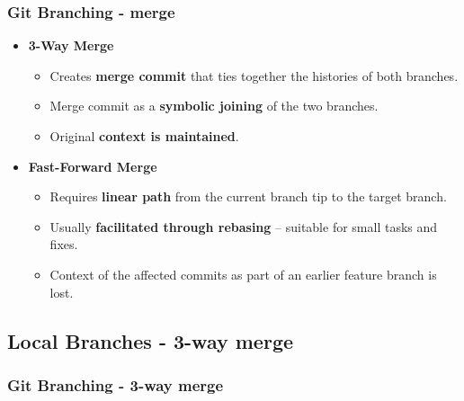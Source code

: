 \begin{frame}
\frametitle{Git Branching - merge}
\begin{itemize}
	\item \textbf{3-Way Merge}
		\begin{itemize}
		\item Creates \textbf{merge commit} that ties together the histories of both branches.
		\item Merge commit as a \textbf{symbolic joining} of the two branches.
		\item Original \textbf{context is maintained}.
		\end{itemize}
	\item \textbf{Fast-Forward Merge}
		\begin{itemize}
		\item Requires \textbf{linear path} from the current branch tip to the target branch.
		\item Usually \textbf{facilitated through rebasing} – suitable for small tasks and fixes.
		\item Context of the affected commits as part of an earlier feature branch is lost.
		\end{itemize}
\end{itemize}
\end{frame}

\subsection[]{Local Branches - 3-way merge}
\begin{frame}
\frametitle{Git Branching - 3-way merge}


\end{frame}

